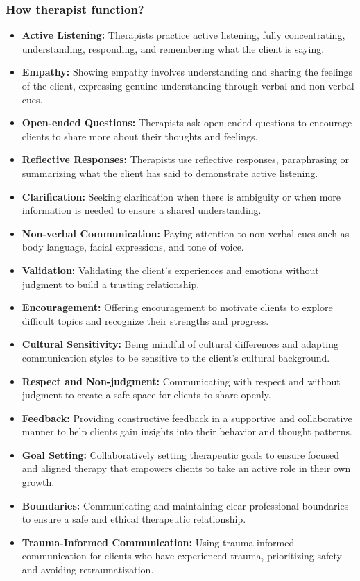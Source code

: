 \subsubsection{How therapist function?}
\begin{itemize}
    \item \textbf{Active Listening:} Therapists practice active listening, fully concentrating, understanding, responding, and remembering what the client is saying.
    \item \textbf{Empathy:} Showing empathy involves understanding and sharing the feelings of the client, expressing genuine understanding through verbal and non-verbal cues.
    \item \textbf{Open-ended Questions:} Therapists ask open-ended questions to encourage clients to share more about their thoughts and feelings.
    \item \textbf{Reflective Responses:} Therapists use reflective responses, paraphrasing or summarizing what the client has said to demonstrate active listening.
    \item \textbf{Clarification:} Seeking clarification when there is ambiguity or when more information is needed to ensure a shared understanding.
    \item \textbf{Non-verbal Communication:} Paying attention to non-verbal cues such as body language, facial expressions, and tone of voice.
    \item \textbf{Validation:} Validating the client's experiences and emotions without judgment to build a trusting relationship.
    \item \textbf{Encouragement:} Offering encouragement to motivate clients to explore difficult topics and recognize their strengths and progress.
    \item \textbf{Cultural Sensitivity:} Being mindful of cultural differences and adapting communication styles to be sensitive to the client's cultural background.
    \item \textbf{Respect and Non-judgment:} Communicating with respect and without judgment to create a safe space for clients to share openly.
    \item \textbf{Feedback:} Providing constructive feedback in a supportive and collaborative manner to help clients gain insights into their behavior and thought patterns.
    \item \textbf{Goal Setting:} Collaboratively setting therapeutic goals to ensure focused and aligned therapy that empowers clients to take an active role in their own growth.
    \item \textbf{Boundaries:} Communicating and maintaining clear professional boundaries to ensure a safe and ethical therapeutic relationship.


    \item \textbf{Trauma-Informed Communication:} Using trauma-informed communication for clients who have experienced trauma, prioritizing safety and avoiding retraumatization.
\end{itemize}
